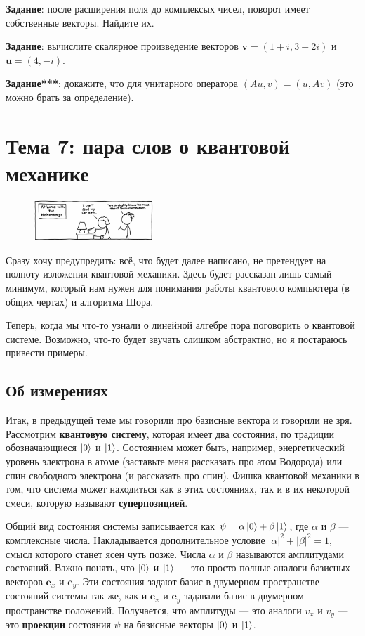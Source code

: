 \documentclass[12pt]{article}
\begin{document}
{\bf Задание}: после расширения поля до комплексых чисел, поворот имеет собственные векторы. Найдите их.

{\bf Задание}: вычислите скалярное произведение векторов $\mathbf{v} = (1 + i, 3 - 2 i)$ и $\mathbf{u} = (4, -i)$.

{\bf Задание***}: докажите, что для унитарного оператора $(Au, v) = (u, Av)$ (это можно брать за определение).
\section*{Тема 7: пара слов о квантовой механике}
\begin{figure}
  \begin{center}
    \includegraphics[width=0.40\textwidth]{quantumjoke1.png}
  \end{center}
\end{figure}
Сразу хочу предупредить: всё, что будет далее написано, не претендует на полноту изложения квантовой механики. Здесь будет рассказан лишь самый минимум, который нам нужен для понимания работы квантового компьютера (в общих чертах) и алгоритма Шора.

Теперь, когда мы что-то узнали о линейной алгебре пора поговорить о квантовой системе. Возможно, что-то будет звучать слишком абстрактно, но я постараюсь привести примеры.

\subsection*{Об измерениях}
Итак, в предыдущей теме мы говорили про базисные вектора и говорили не зря. Рассмотрим {\bf квантовую систему}, которая имеет два состояния, по традиции обозначающиеся $\Ket{0}$ и $\Ket{1}$. Состоянием может быть, например, энергетический уровень электрона в атоме (заставьте меня рассказать про атом Водорода) или спин свободного электрона (и рассказать про спин). Фишка квантовой механики в том, что система может находиться как в этих состояниях, так и в их некоторой смеси, которую называют {\bf суперпозицией}.

Общий вид состояния системы записывается как $\psi = \alpha \Ket{0} + \beta \Ket{1}$, где $\alpha$ и $\beta$ --- комплексные числа. Накладывается дополнительное условие $|\alpha|^2 + |\beta|^2 = 1$, смысл которого станет ясен чуть позже. Числа $\alpha$ и $\beta$ называются амплитудами состояний. Важно понять, что $\Ket{0}$ и $\Ket{1}$ --- это просто полные аналоги базисных векторов $\mathbf{e}_x$ и $\mathbf{e}_y$. Эти состояния задают базис в двумерном пространстве состояний системы так же, как и $\mathbf{e}_x$ и $\mathbf{e}_y$ задавали базис в двумерном пространстве положений. Получается, что амплитуды --- это аналоги $v_x$ и $v_y$ --- это {\bf проекции} состояния $\psi$ на базисные векторы $\Ket{0}$ и $\Ket{1}$.
\end{document}
